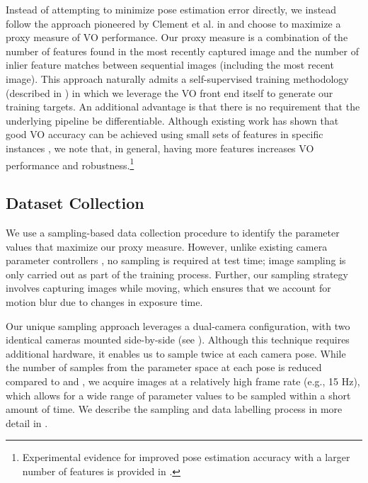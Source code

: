 \documentclass[letterpaper, 10pt, journal, twoside]{IEEEtran}
\begin{document}
Instead of attempting to minimize pose estimation error directly, we instead follow the approach pioneered by Clement et al. in \cite{Clement2020} and choose to maximize a proxy measure of VO performance. Our proxy measure is a combination of the number of features found in the most recently captured image and the number of inlier feature matches between sequential images (including the most recent image). This approach naturally admits a self-supervised training methodology (described in ) in which we leverage the VO front end itself to generate our training targets. An additional advantage is that there is no requirement that the underlying pipeline be differentiable. Although existing work has shown that good VO accuracy can be achieved using small sets of features in specific instances \cite{Cvisic2018}, we note that, in general, having more features increases VO performance and robustness.\footnote{Experimental evidence for improved pose estimation accuracy with a larger number of features is provided in \cite{Tomasi2020}.}

\subsection{Dataset Collection}
\label{sec:datacollection}

We use a sampling-based data collection procedure to identify the parameter values that maximize our proxy measure.  
However, unlike existing camera parameter controllers \cite{Lu2010, Shim2014, Kim2018b, Shin2019}, no sampling is required at test time; image sampling is only carried out as part of the training process.
Further, our sampling strategy involves capturing images while moving, which ensures that we account for motion blur due to changes in exposure time. 

Our unique sampling approach leverages a dual-camera configuration, with two identical cameras mounted side-by-side (see ). 
Although this technique requires additional hardware, it enables us to sample twice at each camera pose. 
While the number of samples from the parameter space at each pose is reduced compared to \cite{Lu2010} and \cite{Shim2014}, we acquire images at a relatively high frame rate (e.g., 15 Hz), which allows for a wide range of parameter values to be sampled within a short amount of time. We describe the sampling and data labelling process in more detail in . 
\end{document}
